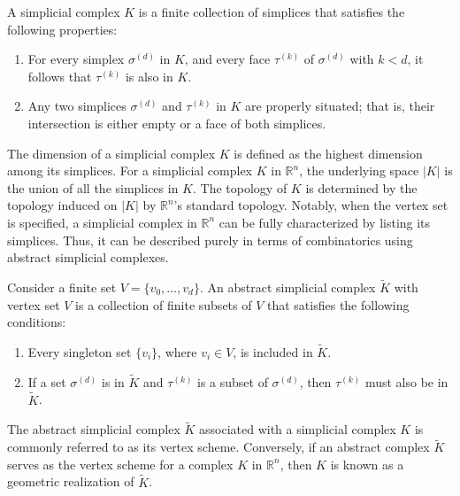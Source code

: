 \begin{definition}
	{\cite[\S 2.2]{boissonnat2018geometric}} \label{simplicialcomplex}
	A simplicial complex $K$ is a finite collection of simplices that satisfies the
	following properties:
	\begin{enumerate}
		\item For every simplex $\sigma^{(d)}$ in $K$, and every face $\tau^{(k)}$
			of $\sigma^{(d)}$ with $k < d$, it follows that $\tau^{(k)}$ is also in $K$.

		\item Any two simplices $\sigma^{(d)}$ and $\tau^{(k)}$ in $K$ are properly situated;
			that is, their intersection is either empty or a face of both simplices.
	\end{enumerate}
\end{definition}

The dimension of a simplicial complex $K$ is defined as the highest dimension among
its simplices. For a simplicial complex $K$ in $\mathbb{R}^{n}$, the underlying space
$\vert K \vert$ is the union of all the simplices in $K$. The topology of $K$ is
determined by the topology induced on $\vert K \vert$ by $\mathbb{R}^{n}$'s
standard topology. Notably, when the vertex set is specified, a simplicial complex
in $\mathbb{R}^{n}$ can be fully characterized by listing its simplices. Thus, it
can be described purely in terms of combinatorics using abstract simplicial complexes.

\begin{definition}
	{\cite[\S 2.3]{boissonnat2018geometric}} \label{abstractsimplicialcomplex}
	Consider a finite set $V = \{v_{0}, \ldots, v_{d}\}$. An abstract simplicial
	complex $\tilde{K}$ with vertex set $V$ is a
	collection of finite subsets of $V$ that satisfies the following conditions:
	\begin{enumerate}
		\item Every singleton set $\{v_{i}\}$, where $v_{i} \in V$, is included in $\tilde
			{K}$.

		\item If a set $\sigma^{(d)}$ is in $\tilde{K}$ and $\tau^{(k)}$ is a subset
			of $\sigma^{(d)}$, then $\tau^{(k)}$ must also be in $\tilde{K}$.
	\end{enumerate}
\end{definition}

The abstract simplicial complex $\tilde{K}$ associated with a simplicial complex
$K$ is commonly referred to as its vertex scheme.
Conversely, if an abstract complex $\tilde{K}$ serves as the vertex scheme for a
complex $K$ in $\mathbb{R}^{n}$, then $K$ is known as a geometric realization of $\tilde{K}$.

